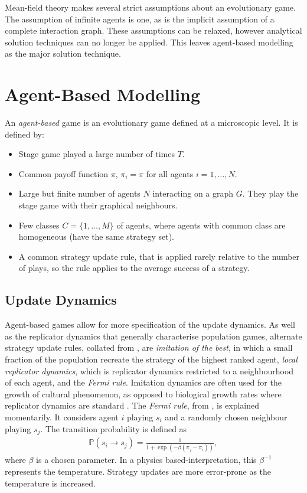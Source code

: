 Mean-field theory makes several strict assumptions about an evolutionary game. The assumption of infinite agents is one, as is the implicit assumption of a complete interaction graph. These assumptions can be relaxed, however analytical solution techniques can no longer be applied. This leaves agent-based modelling as the major solution technique. \\ 


\section{Agent-Based Modelling} \label{ABM}

An \emph{agent-based} game is an evolutionary game defined at a microscopic level. It is defined by: 

\begin{itemize}
    \item Stage game played a large number of times $T$.
    \item  Common payoff function $\pi$,  $\pi_i = \pi$ for all agents $i = 1,\dots, N$. 
    \item Large but finite number of agents $N$ interacting on a graph $G$. They play the stage game with their graphical neighbours.
    \item Few classes $C = \{1,\dots, M\}$ of agents, where agents with common class are homogeneous (have the same strategy set). 
    \item A common strategy update rule, that is applied rarely relative to the number of plays, so the rule applies to the average success of a strategy.
\end{itemize}

\subsection{Update Dynamics} \label{UD}
Agent-based games allow for more specification of the update dynamics. As well as the replicator dynamics that generally characterise population games, alternate strategy update rules, collated from \cite{RN43}, are \emph{imitation of the best}, in which a small fraction of the population recreate the strategy of the highest ranked agent, \emph{local replicator dynamics}, which is replicator dynamics restricted to a neighbourhood of each agent, and the \emph{Fermi rule}. Imitation dynamics are often used for the growth of cultural phenomenon, as opposed to biological growth rates where replicator dynamics are standard \cite{RN30}. The \emph{Fermi rule}, from \cite{RN43}, is explained momentarily. It considers agent $i$ playing $s_i$ and a randomly chosen neighbour playing $s_j$. The transition probability is defined as \\
\begin{align*}
    \mathbb P(s_i \to s_j) = \frac{1}{1+\exp(-\beta(\pi_j - \pi_i))},
\end{align*}
where $\beta$ is a chosen parameter. In a physics based-interpretation, this $\beta^{-1}$ represents the temperature. Strategy updates are more error-prone as the temperature is increased. \\

